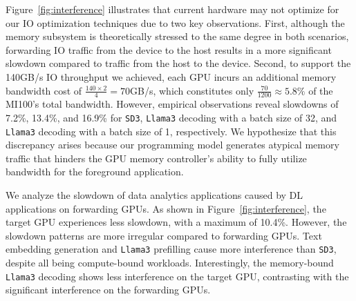 Figure~\ref{fig:interference} illustrates that current hardware may not optimize for our IO optimization techniques due to two key observations.
First, although the memory subsystem is theoretically stressed to the same degree in both scenarios, forwarding IO traffic from the device to the host results in a more significant slowdown compared to traffic from the host to the device.
Second, to support the 140GB/s IO throughput we achieved, each GPU incurs an additional memory bandwidth cost of $\frac{140 \times 2}{4} = 70$GB/s, which constitutes only $\frac{70}{1200} \approx 5.8\%$ of the MI100's total bandwidth.
However, empirical observations reveal slowdowns of 7.2\%, 13.4\%, and 16.9\% for \texttt{SD3}, \texttt{Llama3} decoding with a batch size of 32, and \texttt{Llama3} decoding with a batch size of 1, respectively.
We hypothesize that this discrepancy arises because our programming model generates atypical memory traffic that hinders the GPU memory controller's ability to fully utilize bandwidth for the foreground application.

We analyze the slowdown of data analytics applications caused by DL applications on forwarding GPUs. 
As shown in Figure~\ref{fig:interference}, the target GPU experiences less slowdown, with a maximum of 10.4\%. 
However, the slowdown patterns are more irregular compared to forwarding GPUs. 
Text embedding generation and \texttt{Llama3} prefilling cause more interference than \texttt{SD3}, despite all being compute-bound workloads. 
Interestingly, the memory-bound \texttt{Llama3} decoding shows less interference on the target GPU, contrasting with the significant interference on the forwarding GPUs.

